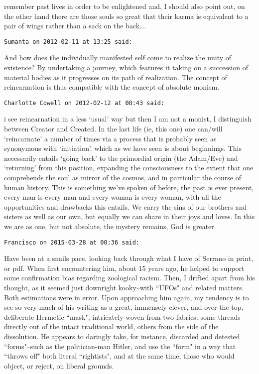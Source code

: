 \begin{footnotesize}
\begin{sffamily}
remember past lives in order to be enlightened and, I should also point out, on the other hand there are those souls so great that their karma is equivalent to a pair of wings rather than a sack on the back….


\hfill

\texttt{Sumanta on 2012-02-11 at 13:25 said: }

And how does the individually manifested self come to realize the unity of existence? By undertaking a journey, which features it taking on a succession of material bodies as it progresses on its path of realization. The concept of reincarnation is thus compatible with the concept of absolute monism.


\hfill

\texttt{Charlotte Cowell on 2012-02-12 at 08:43 said: }

i see reincarnation in a less `usual' way but then I am not a monist, I distinguish between Creator and Created. In the last life (ie, this one) one can/will `reincarnate' a number of times via a process that is probably seen as synonymous with `initiation'. which as we have seen is about beginnings. This necessarily entails `going back' to the primordial origin (the Adam/Eve) and `returning' from this position, expanding the consciousness to the extent that one comprehends the soul as mirror of the cosmos, and in particular the course of human history. This is something we've spoken of before, the past is ever present, every man is every man and every woman is every woman, with all the opportunities and drawbacks this entails. We carry the sins of our brothers and sisters as well as our own, but equally we can share in their joys and loves. In this we are as one, but not absolute, the mystery remains, God is greater.


\hfill

\texttt{Francisco on 2015-03-28 at 00:36 said: }

Have been at a snails pace, looking back through what I have of Serrano in print, or pdf. When first encountering him, about 15 years ago, he helped to support some confirmation bias regarding zoological racism. Then, I drifted apart from his thought, as it seemed just downright kooky–with ``UFOs" and related matters. Both estimations were in error. Upon approaching him again, my tendency is to see so very much of his writing as a great, immensely clever, and over-the-top, deliberate Hermetic ``mask", intricately woven from two fabrics: some threads directly out of the intact traditional world, others from the side of the dissolution. He appears to daringly take, for instance, discarded and detested ``forms"–such as the politician-man Hitler, and use the ``form" in a way that ``throws off" both literal ``rightists", and at the same time, those who would object, or reject, on liberal grounds. 


\end{sffamily}
\end{footnotesize}
